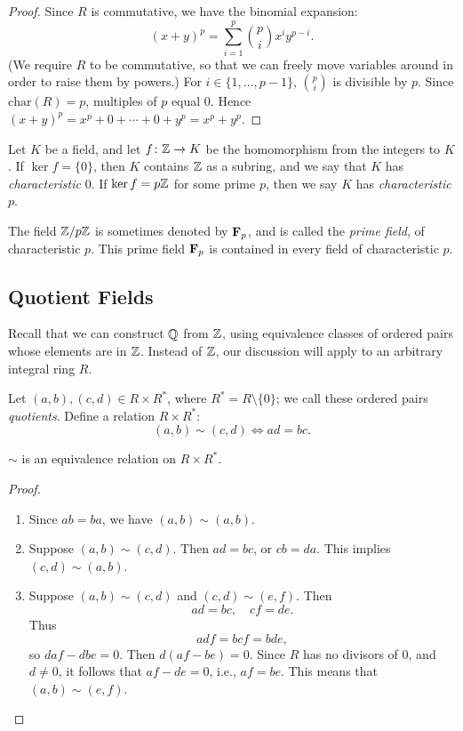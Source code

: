 \begin{proof}
Since $R$ is commutative, we have the binomial expansion:
\[(x+y)^p=\sum_{i=1}^{p}\binom{p}{i}x^i y^{p-i}.\]
(We require $R$ to be commutative, so that we can freely move variables around in order to raise them by powers.) 
For $i\in\{1,\dots,p-1\}$, $\binom{p}{i}$ is divisible by $p$. Since $\mathrm{char}(R)=p$, multiples of $p$ equal $0$. Hence $(x+y)^p=x^p+0+\cdots+0+y^p=x^p+y^p$.
\end{proof}

Let $K$ be a field, and let $f\colon\mathbb Z\to K$ be the homomorphism from the integers to $K$. If $\ker f=\{0\}$, then $K$ contains $\mathbb Z$ as a subring, and we say that $K$ has \emph{characteristic} $0$. If $\ker f=p\mathbb Z$ for some prime $p$, then we say $K$ has \emph{characteristic} $p$. 

The field $\mathbb Z/p\mathbb Z$ is sometimes denoted by $\mathbf F_p$, and is called the \emph{prime field}, of characteristic $p$. This prime field $\mathbf F_p$ is contained in every field of characteristic $p$. 

\subsection{Quotient Fields}
Recall that we can construct $\mathbb Q$ from $\mathbb Z$, using equivalence classes of ordered pairs whose elements are in $\mathbb Z$. 
Instead of $\mathbb Z$, our discussion will apply to an arbitrary integral ring $R$. 

Let $(a,b),(c,d)\in R\times R^*$, where $R^*=R\setminus\{0\}$; we call these ordered pairs \emph{quotients}. Define a relation $R\times R^*$:
\[(a,b)\sim(c,d)\iff ad=bc.\]

\begin{lemma*}
$\sim$ is an equivalence relation on $R\times R^*$.
\end{lemma*}

\begin{proof} \
\begin{enumerate}[label=(\roman*)]
\item Since $ab=ba$, we have $(a,b)\sim(a,b)$.
\item Suppose $(a,b)\sim(c,d)$. Then $ad=bc$, or $cb=da$. This implies $(c,d)\sim(a,b)$.
\item Suppose $(a,b)\sim(c,d)$ and $(c,d)\sim(e,f)$. Then
\[ad=bc,\quad cf=de.\]
Thus 
\[adf=bcf=bde,\]
so $daf-dbe=0$. Then $d(af-be)=0$. Since $R$ has no divisors of $0$, and $d\neq0$, it follows that $af-de=0$, i.e., $af=be$. This means that $(a,b)\sim(e,f)$.
\end{enumerate}
\end{proof}

